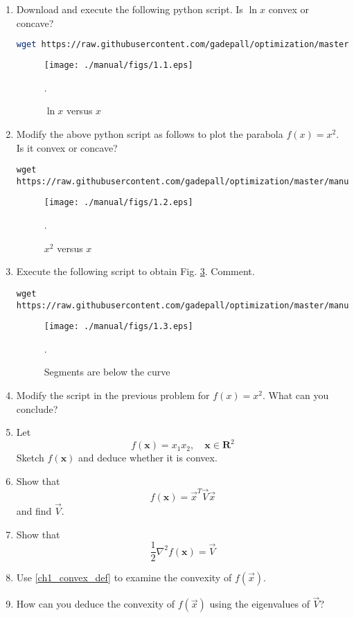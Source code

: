 \documentclass[journal,12pt,twocolumn]{IEEEtran}
\renewcommand\thesection{\arabic{section}}
\begin{document}
\begin{enumerate}[label=\thesection.\arabic*,ref=\thesection.\theenumi]

\item
Download and execute the following python script. Is  $\ln x$ convex or  concave?

%
\begin{lstlisting}[language=sh]
wget https://raw.githubusercontent.com/gadepall/optimization/master/manual/codes/1.1.py
\end{lstlisting}
%
\begin{figure}[!ht]
\centering
\texttt{[image: ./manual/figs/1.1.eps]}
\caption{ $\ln x$ versus $x$}.
\label{fig.1.1}	
\end{figure}
%
\item
Modify the above python script as follows to plot the parabola $f(x) = x^2$. Is it convex or concave?

\begin{lstlisting}
wget https://raw.githubusercontent.com/gadepall/optimization/master/manual/codes/1.2.py
\end{lstlisting}
%
\begin{figure}[!ht]
\centering
\texttt{[image: ./manual/figs/1.2.eps]}
\caption{ $x^2$ versus $x$}.
\label{fig.1.2}	
\end{figure}
%
\item
Execute the following script to obtain Fig. \ref{fig.1.3}. Comment.

%
\begin{lstlisting}
wget https://raw.githubusercontent.com/gadepall/optimization/master/manual/codes/1.3.py
\end{lstlisting}

%
\begin{figure}[!ht]
\centering
\texttt{[image: ./manual/figs/1.3.eps]}
\caption{ Segments are below the curve}.
\label{fig.1.3}	
\end{figure}
%
\item
Modify the script in the previous problem for $f(x) = x^2$.  What can you conclude?

\item
Let 
\begin{equation}
f(\mathbf{x}) = x_1x_2, \quad \mathbf{x} \in \mathbf{R}^2
\end{equation}
Sketch $f(\mathbf{x})$ and deduce whether it is convex.
\item Show that 
\begin{equation}
f(\mathbf{x}) = \vec{x}^T\vec{V}\vec{x} 
\end{equation}
%
and find $\vec{V}$.
\item Show that 
\begin{equation}
\frac{1}{2}\nabla^2f(\mathbf{x}) = \vec{V}
\end{equation}

\item Use \eqref{ch1_convex_def} to examine the convexity of $f(\vec{x})$.
\item How can you deduce the convexity of $f(\vec{x})$ using the eigenvalues of $\vec{V}$?

\end{enumerate}
%
\end{document}
